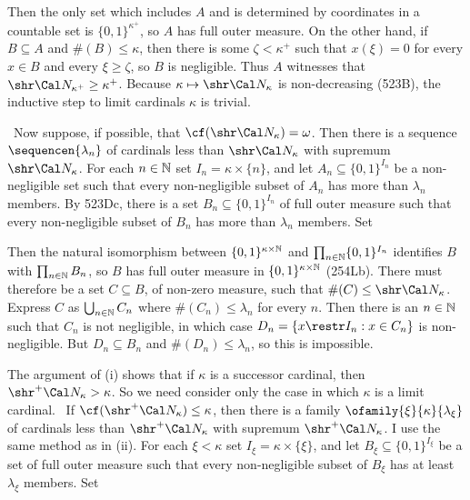 {\noindent Then the only set which includes $A$ and is determined by coordinates
in a countable set is $\{0,1\}^{\kappa^+}$, so $A$ has full
outer measure.   On the other hand, if $B\subseteq A$ and
$\#(B)\le\kappa$, then there is some $\zeta<\kappa^+$ such that
$x(\xi)=0$ for every $x\in B$ and every $\xi\ge\zeta$, so $B$ is
negligible.   Thus $A$ witnesses that
$\shr\Cal N_{\kappa^+}\ge\kappa^+$.   Because
$\kappa\mapsto\shr\Cal N_{\kappa}$ is non-decreasing (523B),
the inductive step
to limit cardinals $\kappa$ is trivial.

\medskip

 \Quer\ Now suppose, if possible, that
$\cf(\shr\Cal N_{\kappa})=\omega$.
Then there is a sequence $\sequencen{\lambda_n}$ of cardinals
less than $\shr\Cal N_{\kappa}$ with supremum $\shr\Cal N_{\kappa}$.
For each $n\in\Bbb N$ set $I_n=\kappa\times\{n\}$, and let
$A_n\subseteq\{0,1\}^{I_n}$ be a
non-negligible set such that every non-negligible
subset of $A_n$ has more than $\lambda_n$ members.
By 523Dc, there is a set $B_n\subseteq\{0,1\}^{I_n}$ of full outer
measure such that every non-negligible
subset of $B_n$ has more than $\lambda_n$ members.   Set


\noindent Then the natural isomorphism between
$\{0,1\}^{\kappa\times\Bbb N}$ and $\prod_{n\in\Bbb N}\{0,1\}^{I_n}$
identifies $B$ with $\prod_{n\in\Bbb N}B_n$, so $B$ has full outer
measure in $\{0,1\}^{\kappa\times\Bbb N}$ (254Lb).   There must therefore
be a set $C\subseteq B$, of non-zero measure, such that
$\#(C)\le\shr\Cal N_{\kappa}$.   Express $C$ as
$\bigcup_{n\in\Bbb N}C_n$ where $\#(C_n)\le\lambda_n$ for every
$n$.   Then there is an $n\in\Bbb N$ such that $C_n$ is not negligible,
in which case $D_n=\{x\restr I_n:x\in C_n\}$ is non-negligible.   But
$D_n\subseteq B_n$ and $\#(D_n)\le\lambda_n$, so this is impossible.\ \Bang

\medskip

 The argument of (i) shows that if $\kappa$ is a successor
cardinal, then $\shr^+\Cal N_{\kappa}>\kappa$.   So we need consider only
the case in which $\kappa$ is a limit cardinal.
\Quer\ If $\cf(\shr^+\Cal N_{\kappa})\le\kappa$, then
there is a family $\ofamily{\xi}{\kappa}{\lambda_{\xi}}$ of cardinals
less than $\shr^+\Cal N_{\kappa}$ with supremum $\shr^+\Cal N_{\kappa}$.
I use the same method as in (ii).
For each $\xi<\kappa$ set $I_{\xi}=\kappa\times\{\xi\}$, and let
$B_{\xi}\subseteq\{0,1\}^{I_{\xi}}$ be a
set of full outer measure such that every non-negligible
subset of $B_{\xi}$ has at least $\lambda_{\xi}$ members.  Set

}
